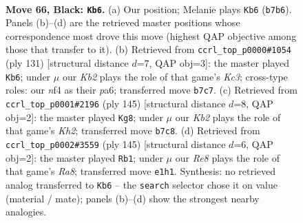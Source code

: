 \documentclass[11pt]{article}
\begin{document}
\clearpage

\begin{figure}[p]\centering
\begin{subfigure}{0.46\textwidth}\centering
\resizebox{\linewidth}{!}{%
\newchessgame
\chessboard[
  setfen={8/1k6/8/RP6/5N2/8/2K3P1/4r3 b - - 2 66},
  showmover=false,
  pgfstyle=straightmove, color=movearrow, markmove={b7-b6}
]}
\caption{}
\end{subfigure}\hfill
\begin{subfigure}{0.46\textwidth}\centering
\resizebox{\linewidth}{!}{%
\newchessgame
\chessboard[
  setfen={8/8/P1k5/8/1KPR4/5r2/8/8 b - - 0 66},
  showmover=false,
  pgfstyle=straightmove, color=movearrow, markmove={c6-b6}
]}
\caption{}
\end{subfigure}
\\[4pt]
\begin{subfigure}{0.46\textwidth}\centering
\resizebox{\linewidth}{!}{%
\newchessgame
\chessboard[
  setfen={8/7k/5P2/5R2/7P/6K1/2r5/8 b - - 0 73},
  showmover=false,
  pgfstyle=straightmove, color=movearrow, markmove={h7-g8}
]}
\caption{}
\end{subfigure}\hfill
\begin{subfigure}{0.46\textwidth}\centering
\resizebox{\linewidth}{!}{%
\newchessgame
\chessboard[
  setfen={7R/8/6k1/8/7P/8/5PK1/r7 b - - 22 73},
  showmover=false,
  pgfstyle=straightmove, color=movearrow, markmove={a1-b1}
]}
\caption{}
\end{subfigure}
\caption{\textbf{Move 66, Black: \texttt{Kb6}.} (a) Our position; Melanie plays \texttt{Kb6} (\texttt{b7b6}). Panels (b)--(d) are the retrieved master positions whose correspondence most drove this move (highest QAP objective among those that transfer to it). (b) Retrieved from \texttt{ccrl\_top\_p0000\#1054} (ply 131) [structural distance $d$=7, QAP obj=3]: the master played \texttt{Kb6}; under $\mu$ our \emph{Kb2} plays the role of that game's \emph{Kc3}; cross-type roles: our \emph{n}f4 as their \emph{p}a6; transferred move \texttt{b7c7}. (c) Retrieved from \texttt{ccrl\_top\_p0001\#2196} (ply 145) [structural distance $d$=8, QAP obj=2]: the master played \texttt{Kg8}; under $\mu$ our \emph{Kb2} plays the role of that game's \emph{Kh2}; transferred move \texttt{b7c8}. (d) Retrieved from \texttt{ccrl\_top\_p0002\#3559} (ply 145) [structural distance $d$=6, QAP obj=2]: the master played \texttt{Rb1}; under $\mu$ our \emph{Re8} plays the role of that game's \emph{Ra8}; transferred move \texttt{e1h1}. Synthesis: no retrieved analog transferred to \texttt{Kb6} -- the \texttt{search} selector chose it on value (material / mate); panels (b)--(d) show the strongest nearby analogies.}
\label{fig:thought-m131}
\end{figure}
\end{document}
